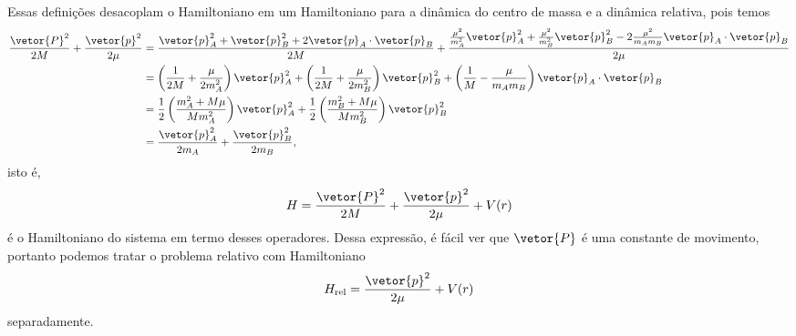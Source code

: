 Essas definições desacoplam o Hamiltoniano em um Hamiltoniano para a dinâmica do centro de massa e a dinâmica relativa, pois temos
\begin{align*}
   \frac{\vetor{P}^2}{2M} + \frac{\vetor{p}^2}{2\mu} 
   &= \frac{\vetor{p}_A^2 + \vetor{p}_B^2 + 2 \vetor{p}_A \cdot \vetor{p}_B}{2M} + \frac{\frac{\mu^2}{m_A^2}\vetor{p}_A^2 + \frac{\mu^2}{m_B^2} \vetor{p}_B^2 - 2\frac{\mu^2}{m_A m_B}\vetor{p}_A \cdot \vetor{p}_B}{2\mu}\\
   &= \left(\frac{1}{2M} + \frac{\mu}{2m_A^2}\right)\vetor{p}_A^2 + \left(\frac{1}{2M} + \frac{\mu}{2m_B^2}\right)\vetor{p}_B^2 + \left(\frac{1}{M} - \frac{\mu}{m_A m_B}\right)\vetor{p}_A \cdot \vetor{p}_B\\
   &= \frac12\left(\frac{m_A^2 + M\mu}{Mm_A^2}\right)\vetor{p}_A^2 + \frac12\left(\frac{m_B^2 + M\mu}{Mm_B^2}\right)\vetor{p}_B^2\\
   &= \frac{\vetor{p}_A^2}{2m_A} + \frac{\vetor{p}_B^2}{2m_B},
\end{align*}
isto é,
\begin{equation*}
   H = \frac{\vetor{P}^2}{2 M} + \frac{\vetor{p}^2}{2 \mu} + V(r)
\end{equation*}
é o Hamiltoniano do sistema em termo desses operadores. Dessa expressão, é fácil ver que \(\vetor{P}\) é uma constante de movimento, portanto podemos tratar o problema relativo com Hamiltoniano
\begin{equation*}
   H_\mathrm{rel} = \frac{\vetor{p}^2}{2\mu} + V(r)
\end{equation*}
separadamente. 

